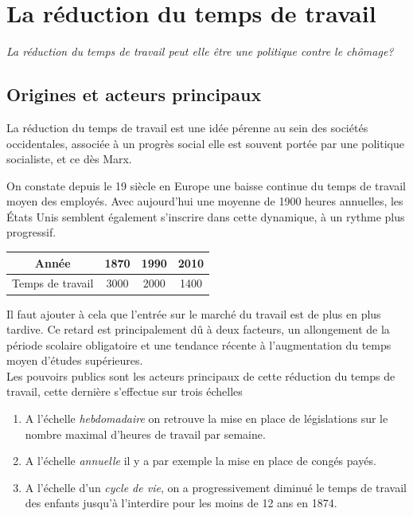 \documentclass[main.tex]{subfiles}
\begin{document}
\chapter{La réduction du temps de travail}
\textit{La réduction du temps de travail peut elle être une politique contre le chômage?}

\section{Origines et acteurs principaux}
La réduction du temps de travail est une idée pérenne au sein des sociétés occidentales, associée à un progrès social elle est souvent portée par une politique socialiste, et ce dès Marx. \\ 

\begin{minipage}{0.4\textwidth}
        On constate depuis le 19 siècle en Europe une baisse continue du temps de travail moyen des employés. Avec aujourd'hui une moyenne de 1900 heures annuelles, les États Unis semblent également s'inscrire dans cette dynamique, à un rythme plus progressif.
\end{minipage}
\hfill
\begin{minipage}{0.5\textwidth}
        \centering
        \label{tab:trav_eur}
        \begin{tabular}{|c|c|c|c|}
                \hline
                Année & 1870 & 1990 & 2010 \\
                \hline
                Temps de travail & 3000 & 2000 & 1400 \\
                \hline
        \end{tabular}
\end{minipage}

\bigskip

Il faut ajouter à cela que l'entrée sur le marché du travail est de plus en plus tardive. Ce retard est principalement dû à deux facteurs, un allongement de la période scolaire obligatoire et une tendance récente à l'augmentation du temps moyen d'études supérieures. \\

Les pouvoirs publics sont les acteurs principaux de cette réduction du temps de travail, cette dernière s'effectue sur trois échelles
\begin{enumerate}
        \item A l'échelle \emph{hebdomadaire} on retrouve la mise en place de législations sur le nombre maximal d'heures de travail par semaine.
        \item A l'échelle \emph{annuelle} il y a par exemple la mise en place de congés payés.
        \item A l'échelle d'un \emph{cycle de vie}, on a progressivement diminué le temps de travail des enfants jusqu'à l'interdire pour les moins de 12 ans en 1874.
\end{enumerate}
\end{document}
